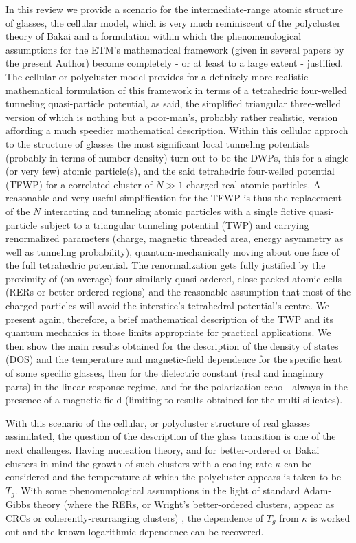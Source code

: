\documentclass[10pt]{article}
\begin{document}
In this review we provide a scenario for the intermediate-range atomic structure 
of glasses, the cellular model, which is very much reminiscent of the polycluster 
theory of Bakai and a formulation within which the phenomenological assumptions 
for the ETM's mathematical framework (given in several papers by the present 
Author) become completely - or at least to a large extent - justified. The cellular 
or polycluster model provides for a definitely more realistic mathematical 
formulation of this framework in terms of a tetrahedric four-welled tunneling 
quasi-particle potential, as said, the simplified triangular three-welled version of 
which is nothing but a poor-man's, probably rather realistic, version affording a 
much speedier mathematical description. Within this cellular approch to the 
structure of glasses the most significant local tunneling potentials (probably in 
terms of number density) turn out to be the DWPs, this for a single (or very few) 
atomic particle(s), and the said tetrahedric four-welled potential (TFWP) for a 
correlated cluster of $N\gg 1$ charged real atomic particles. A reasonable and 
very useful simplification for the TFWP is thus the replacement of the $N$ 
interacting and tunneling atomic particles with a single fictive quasi-particle 
subject to a triangular tunneling potential (TWP) and carrying renormalized 
parameters (charge, magnetic threaded area, energy asymmetry as well as 
tunneling probability), quantum-mechanically moving about one face of the full 
tetrahedric potential. The renormalization gets fully justified by the proximity 
of (on average) four similarly quasi-ordered, close-packed atomic cells (RERs or 
better-ordered regions) and the reasonable assumption that most of the charged 
particles will avoid the interstice's tetrahedral potential's centre.
We present again, therefore, a brief mathematical description of the TWP and its 
quantum mechanics in those limits appropriate for practical applications. We 
then show the main results obtained for the description of the density of states 
(DOS) and the temperature and magnetic-field dependence for the specific heat of 
some specific glasses, then for the dielectric constant (real and imaginary parts) in 
the linear-response regime, and for the polarization echo - always in the presence 
of a magnetic field (limiting to results obtained for the multi-silicates).

With this scenario of the cellular, or polycluster structure of real glasses assimilated, 
the question of the description of the glass transition is one of the next challenges.
Having nucleation theory, and for better-ordered or Bakai clusters in mind the 
growth of such clusters with a cooling rate $\kappa$ can be considered and the 
temperature at which the polycluster appears is taken to be $T_g$. With some 
phenomenological assumptions in the light of standard Adam-Gibbs theory (where
the RERs, or Wright's better-ordered clusters, appear as CRCs or 
coherently-rearranging clusters) \cite{AG1965}, the dependence of $T_g$ from 
$\kappa$ is worked out and the known logarithmic dependence can be recovered. 
\end{document}
